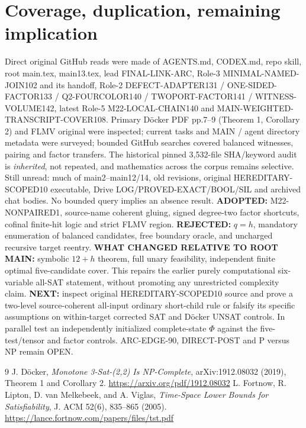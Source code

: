 \documentclass[11pt]{article}
\begin{document}
\section{Coverage, duplication, remaining implication}
Direct original GitHub reads were made of AGENTS.md, CODEX.md, repo skill, root main.tex, main13.tex, lead FINAL-LINK-ARC, Role-3 MINIMAL-NAMED-JOIN102 and its handoff, Role-2 DEFECT-ADAPTER131 / ONE-SIDED-FACTOR133 / Q2-FOURCOLOR140 / TWOPORT-FACTOR141 / WITNESS-VOLUME142, latest Role-5 M22-LOCAL-CHAIN140 and MAIN-WEIGHTED-TRANSCRIPT-COVER108. Primary D\"ocker PDF pp.7--9 (Theorem 1, Corollary 2) and FLMV original were inspected; current tasks and MAIN / agent directory metadata were surveyed; bounded GitHub searches covered balanced witnesses, pairing and factor transfers. The historical pinned 3,532-file SHA/keyword audit is \emph{inherited}, not repeated, and mathematics across the corpus remains selective. Still unread: much of main2--main12/14, old revisions, original HEREDITARY-SCOPED10 executable, Drive LOG/PROVED-EXACT/BOOL/SIL and archived chat bodies. No bounded query implies an absence result.
\textbf{ADOPTED:} M22-NONPAIRED1, source-name coherent gluing, signed degree-two factor shortcuts, cofinal finite-hit logic and strict FLMV region. \textbf{REJECTED:} \(q=h\), mandatory enumeration of balanced candidates, free boundary oracle, and uncharged recursive target reentry. \textbf{WHAT CHANGED RELATIVE TO ROOT MAIN:} symbolic \(12+h\) theorem, full unary feasibility, independent finite optimal five-candidate cover. This repairs the earlier purely computational six-variable all-SAT statement, without promoting any unrestricted complexity claim.
\textbf{NEXT:} inspect original HEREDITARY-SCOPED10 source and prove a two-level source-coherent all-input ordinary short-child rule or falsify its specific assumptions on within-target corrected SAT and D\"ocker UNSAT controls. In parallel test an independently initialized complete-state \(\Phi\) against the five-test/tensor and factor controls. ARC-EDGE-90, DIRECT-POST and P versus NP remain OPEN.

\begin{thebibliography}{9}
 J. D\"ocker, \emph{Monotone 3-Sat-(2,2) Is NP-Complete}, arXiv:1912.08032 (2019), Theorem 1 and Corollary 2. \url{https://arxiv.org/pdf/1912.08032}
 L. Fortnow, R. Lipton, D. van Melkebeek, and A. Viglas, \emph{Time-Space Lower Bounds for Satisfiability}, J. ACM 52(6), 835--865 (2005). \url{https://lance.fortnow.com/papers/files/tst.pdf}
\end{thebibliography}
\end{document}
